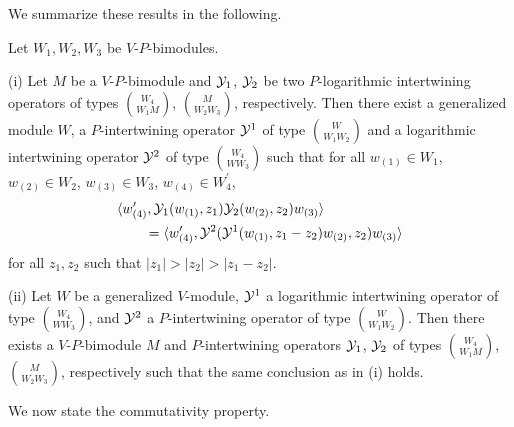 \documentclass[12pt]{article}
\begin{document}
We summarize these results in the following.
\begin{thm} \label{assoc1} 
  Let $W_1, W_2, W_3$ be $V$-$P$-bimodules.

  (i) Let $M$ be a $V$-$P$-bimodule and
  $\mathcal{Y}_1$, $\mathcal{Y}_2$ be two $P$-logarithmic intertwining operators of types
  $\binom{W_4}{W_1 M}$, $\binom{M}{W_2W_3}$, respectively. Then there exist a
  generalized module $W$, a $P$-intertwining operator $\mathcal{Y}^1$ of type $\binom{W}{W_1 W_2}$
  and a logarithmic intertwining operator $\mathcal{Y}^2$ of type $\binom{W_4}{WW_3}$ such that
  for all $w_{(1)}\in W_1$, $w_{(2)}\in W_2$, $w_{(3)}\in W_3$, $w_{(4)}\in W_4^\prime$,
  \begin{align*} 
    &\langle w_{(4)}^\prime, \mathcal{Y}_1(w_{(1)}, z_1)\mathcal{Y}_2(w_{(2)}, z_2) w_{(3)}\rangle\\
    &\qquad = \langle w_{(4)}^\prime, \mathcal{Y}^2(\mathcal{Y}^1(w_{(1)}, z_1-z_2)w_{(2)}, z_2) w_{(3)}\rangle
  \end{align*}
  for all $z_1, z_2$ such that $|z_1| > |z_2| > |z_1 - z_2|$.

  (ii) Let $W$ be a generalized $V$-module, $\mathcal{Y}^1$ a logarithmic intertwining
  operator of type $\binom{W_4}{WW_3}$, and $\mathcal{Y}^2$ a $P$-intertwining operator of type
  $\binom{W}{W_1 W_2}$. Then there exists a $V$-$P$-bimodule $M$ and $P$-intertwining
  operators $\mathcal{Y}_1$, $\mathcal{Y}_2$ of types $\binom{W_4}{W_1 M}$, $\binom{M}{W_2W_3}$, respectively
  such that the same conclusion as in (i) holds.
\end{thm}

We now state the commutativity property.
\end{document}
